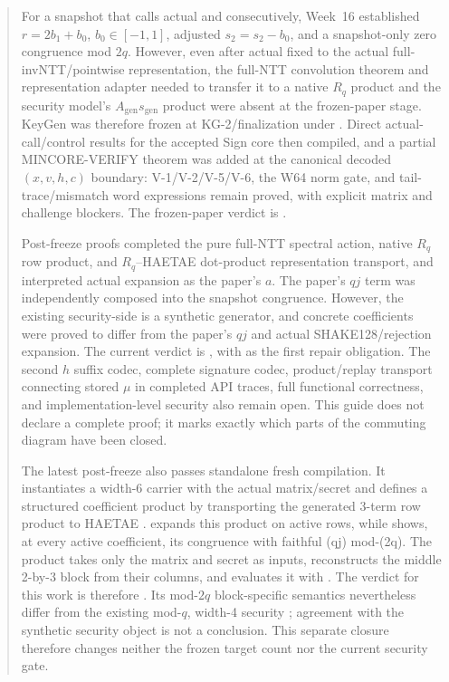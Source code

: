 \documentclass[11pt,a4paper]{article}
\begin{document}
\begin{abstract}
For a snapshot that calls actual  and
 consecutively, Week~16 established
\(r=2b_1+b_0\), \(b_0\in[-1,1]\), adjusted \(s_2=s_2-b_0\), and a
snapshot-only zero congruence mod \(2q\). However, even after actual
 fixed 
to the actual full-invNTT/pointwise representation, the full-NTT convolution
theorem and representation adapter needed to transfer it to a native \(R_q\)
product and the security model's \(A_{\mathrm{gen}}s_{\mathrm{gen}}\) product
were absent at the frozen-paper stage. KeyGen was therefore frozen at
KG-2/finalization under . Direct actual-call/control
results for the accepted Sign core then compiled, and a partial MINCORE-VERIFY
theorem was added at the canonical decoded \((x,v,h,c)\) boundary:
V-1/V-2/V-5/V-6, the W64 norm gate, and tail-trace/mismatch word expressions
remain proved, with explicit matrix and challenge blockers.
The frozen-paper verdict is \FrozenPaperGate.

Post-freeze proofs completed the pure full-NTT spectral action, native \(R_q\)
row product, and \(R_q\)--HAETAE dot-product representation transport, and
interpreted actual  expansion as the paper's \(a\).
The paper's \(qj\) term was independently composed into the snapshot congruence.
However, the existing security-side  is a
synthetic generator, and concrete coefficients were proved to differ from the
paper's \(qj\) and actual SHAKE128/rejection expansion.
The current verdict is \CurrentGate, with
 as the first repair obligation.
The second \(h\) suffix codec, complete signature codec, product/replay transport
connecting stored \(\mu\) in completed API traces, full functional correctness,
and implementation-level security also remain open. This guide does not declare
a complete proof; it marks exactly which parts of the commuting diagram have
been closed.

The latest post-freeze  also passes
standalone fresh compilation. It instantiates a width-6 carrier with the actual
matrix/secret and defines a structured coefficient product by transporting the
generated 3-term row product to HAETAE .
 expands this product on active
rows, while
shows, at every active coefficient, its congruence with faithful (qj) mod-(2q).
The product takes only the matrix and secret as inputs, reconstructs the middle
2-by-3 block from their columns, and evaluates it with .
The verdict for this work is therefore \FaithfulAugmentedVerdict.
Its mod-\(2q\) block-specific semantics nevertheless differ from the existing
mod-\(q\), width-4 security ; agreement with the
synthetic security object is not a conclusion. This separate closure therefore
changes neither the frozen target count nor the current security gate.
\end{abstract}
\end{document}
